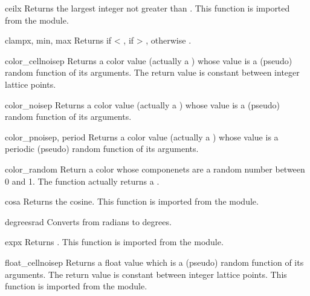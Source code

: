 \begin{funcdesc}{ceil}{x}
Returns the largest integer not greater than . This function is
imported from the  module.
\end{funcdesc}

\begin{funcdesc}{clamp}{x, min, max}
Returns  if  < ,  if  > , 
otherwise .
\end{funcdesc}

\begin{funcdesc}{color_cellnoise}{p}
Returns a color value (actually a ) whose value is a (pseudo)
random function of its arguments. The return value is constant between
integer lattice points.
\end{funcdesc}

\begin{funcdesc}{color_noise}{p}
Returns a color value (actually a ) whose value is a (pseudo)
random function of its arguments.
\end{funcdesc}

\begin{funcdesc}{color_pnoise}{p, period}
Returns a color value (actually a ) whose value is a periodic
(pseudo) random function of its arguments.
\end{funcdesc}

\begin{funcdesc}{color_random}{}
Return a color whose componenets are a random number between 0 and
1. The function actually returns a .
\end{funcdesc}

\begin{funcdesc}{cos}{a}
Returns the cosine. This function is imported from the  module.
\end{funcdesc}

\begin{funcdesc}{degrees}{rad}
Converts from radians to degrees.
\end{funcdesc}

\begin{funcdesc}{exp}{x}
Returns . This function is imported from the
 module.
\end{funcdesc}

\begin{funcdesc}{float_cellnoise}{p}
Returns a float value which is a (pseudo) random function of its
arguments. The return value is constant between integer lattice
points. This function is imported from the  module.
\end{funcdesc}

